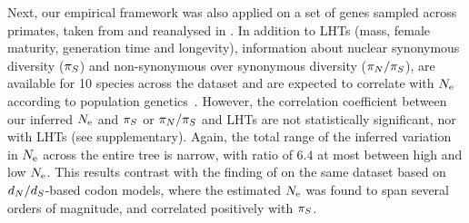 \documentclass{article}
\begin{document}

    Next, our empirical framework was also applied on a set of genes sampled across primates, taken from \citet{Perelman2011} and reanalysed in \citet{Brevet2019}.
    In addition to LHTs (mass, female maturity, generation time and longevity), information about nuclear {synonymous} diversity ($\pi_S$) and {non-synonymous} over {synonymous} diversity ($\pi_N / \pi_S$), are available for 10 species across the dataset and are expected to correlate with $N_{\text{e}}$ according to population genetics~\citep{Eyre-walker2007, Galtier2016}.
    However, the correlation coefficient between our inferred $N_{\text{e}}$ and $\pi_S$ or $\pi_N / \pi_S$ and LHTs are not statistically significant, nor with {LHT}s (see supplementary).
    Again, the total range of the inferred variation in $N_{\text{e}}$ across the entire tree is narrow, with ratio of $6.4$ at most between high and low $N_{\text{e}}$.
    This results contrast with the finding of \citet{Brevet2019} on the same dataset based on $d_N / d_S$-based {codon} models, where the estimated $N_{\text{e}}$ was found to span several orders of magnitude, and correlated positively with $\pi_S$.
\end{document}
